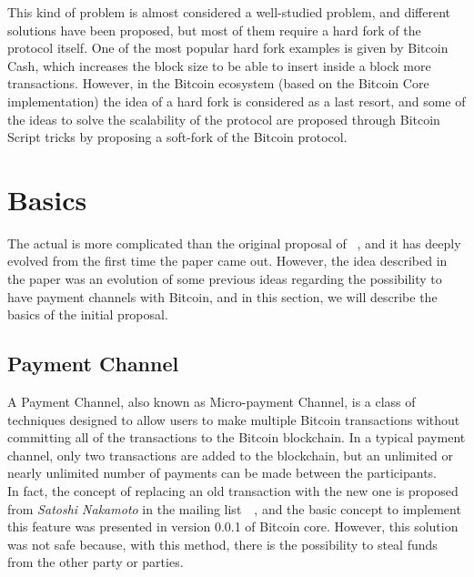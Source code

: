 This kind of problem is almost considered a well-studied problem, and different solutions have been proposed, but most of them require a hard fork of the protocol itself.
One of the most popular hard fork examples is given by Bitcoin Cash, which 
increases the block size to be able to insert inside a block more transactions.
However, in the Bitcoin ecosystem (based on the Bitcoin Core implementation) the idea of a hard fork is considered 
as a last resort, and some of the ideas to solve the scalability of the protocol are proposed through 
Bitcoin Script tricks by proposing a soft-fork of the Bitcoin protocol.

\section{{\LN} Basics}

The actual {\LN} is more complicated than the original proposal of  ~\cite{lightning-network-paper}, and it has deeply
evolved from the first time the paper came out. However, the idea described in the paper was an evolution
of some previous ideas regarding the possibility to have payment channels with Bitcoin, and in this section, we will describe the basics of the initial proposal.

\subsection{Payment Channel}

A Payment Channel, also known as Micro-payment Channel, is a class of techniques designed to allow users to make multiple
Bitcoin transactions without committing all of the transactions to the Bitcoin blockchain. In a typical payment channel,
only two transactions are added to the blockchain, but an unlimited or nearly unlimited number of payments
can be made between the participants.\\
In fact, the concept of replacing an old transaction with the new one is proposed from \emph{Satoshi Nakamoto}
in the mailing list~~\cite{payment-channels-satoshi}, and
the basic concept to implement this feature was presented in version 0.0.1 of Bitcoin core. However, this solution
was not safe because, with this method, there is the possibility to steal funds from the other party or parties.\\

